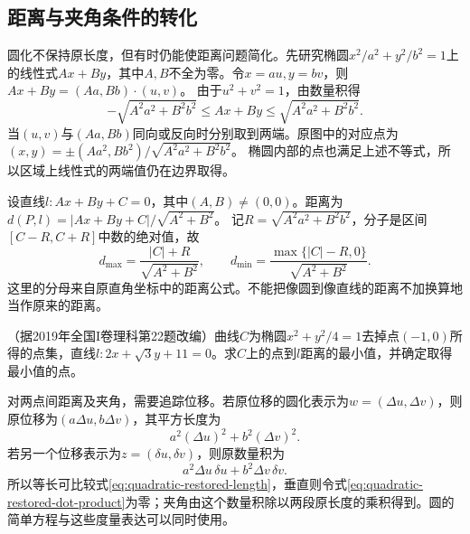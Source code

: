 \newpage
\subsection{距离与夹角条件的转化}
\label{subsec:quadratic-affine-metric-conditions}

圆化不保持原长度，但有时仍能使距离问题简化。先研究椭圆\(x^2/a^2+y^2/b^2=1\)上的线性式\(Ax+By\)，其中\(A,B\)不全为零。令\(x=au,y=bv\)，则\(Ax+By=(Aa,Bb)\cdot(u,v)\)。
由于\(u^2+v^2=1\)，由数量积得
\begin{equation}\label{eq:quadratic-ellipse-linear-range}
    -\sqrt{A^2a^2+B^2b^2}\le Ax+By\le\sqrt{A^2a^2+B^2b^2} .
\end{equation}
当\((u,v)\)与\((Aa,Bb)\)同向或反向时分别取到两端。原图中的对应点为\((x,y)=\pm(Aa^2,Bb^2)/\sqrt{A^2a^2+B^2b^2}\)。
椭圆内部的点也满足上述不等式，所以区域上线性式的两端值仍在边界取得。

设直线\(l:Ax+By+C=0\)，其中\((A,B)\ne(0,0)\)。距离为\(d(P,l)=|Ax+By+C|/\sqrt{A^2+B^2}\)。
记\(R=\sqrt{A^2a^2+B^2b^2}\)，分子是区间\([C-R,C+R]\)中数的绝对值，故
\begin{equation}\label{eq:quadratic-ellipse-line-distance-range}
    d_{\max}=\frac{|C|+R}{\sqrt{A^2+B^2}} ,\qquad
    d_{\min}=\frac{\max\{|C|-R,0\}}{\sqrt{A^2+B^2}} .
\end{equation}
这里的分母来自原直角坐标中的距离公式。不能把像圆到像直线的距离不加换算地当作原来的距离。

\begin{samepage}
\begin{example}\label{ex:quadratic-affine-line-distance}
（据2019年全国I卷理科第22题改编）曲线\(C\)为椭圆\(x^2+y^2/4=1\)去掉点\((-1,0)\)所得的点集，直线\(l:2x+\sqrt3y+11=0\)。求\(C\)上的点到\(l\)距离的最小值，并确定取得最小值的点。
\end{example}
\end{samepage}

对两点间距离及夹角，需要追踪位移。若原位移的圆化表示为\(w=(\Delta u,\Delta v)\)，则原位移为\((a\Delta u,b\Delta v)\)，其平方长度为
\begin{equation}\label{eq:quadratic-restored-length}
    a^2(\Delta u)^2+b^2(\Delta v)^2 .
\end{equation}
若另一个位移表示为\(z=(\delta u,\delta v)\)，则原数量积为
\begin{equation}\label{eq:quadratic-restored-dot-product}
    a^2\Delta u\,\delta u+b^2\Delta v\,\delta v .
\end{equation}
所以等长可比较式\eqref{eq:quadratic-restored-length}，垂直则令式\eqref{eq:quadratic-restored-dot-product}为零；夹角由这个数量积除以两段原长度的乘积得到。圆的简单方程与这些度量表达可以同时使用。

